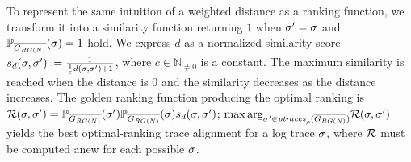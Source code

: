 To represent the same intuition of a weighted distance as a ranking function, we transform it into a
similarity function returning $1$ when $\nonlogtrace=\logtrace$ and $\probskip{\logtrace}=1$ hold. We express $d$ as
a normalized similarity score $s_d(\logtrace,\nonlogtrace):=\frac{1}{\frac{1}{c}d(\logtrace,\nonlogtrace)+1}$, where  
$c\in\mathbb{N}_{\neq0}$ is a constant. The maximum similarity is reached when the distance is $0$ and the similarity decreases 
as the distance increases. 
 The golden ranking function producing the optimal ranking is 
 $\goldenrank(\logtrace,\nonlogtrace)=\probskip{\nonlogtrace} \probskip{\logtrace} s_d(\logtrace,\nonlogtrace)$;
${\max\arg}_{\nonlogtrace\in \WCal{\pmin}{n}} \goldenrank(\logtrace,{\nonlogtrace})$ yields the best optimal-ranking trace 
alignment for a log trace $\logtrace$, where $\goldenrank$ must be computed anew for each possible $\logtrace$. 


